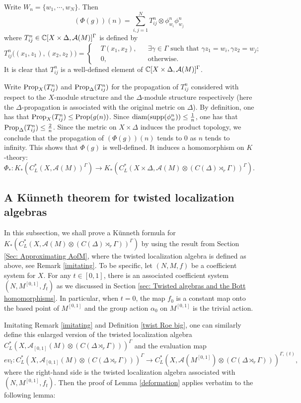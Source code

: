 \documentclass[11pt]{article}
\theoremstyle{definition}
\theoremstyle{plain}
\def\A{\mathcal A}\def\C{\mathcal C}\def\B{\mathcal B}\def\E{\mathcal E}\def\O{\mathcal O}\def\h{\mathfrak h}\def\K{\mathcal K}\def\F{\mathcal F}\def\P{\mathcal P}\def\L{\mathcal L}\def\R{\mathcal R}\def\Q{\mathcal Q}\def\H{\mathcal H}\def\S{\mathcal S}\def\N{\mathcal N}\def\U{\mathcal U}\def\V{\mathcal V}
\def\supp{\textup{supp}}
\def\prop{\textup{Prop}}
\def\diam{\textup{diam}}
\def\ox{\otimes}
\def\ox{\otimes}
\def\Ga{\Gamma}
\begin{document}
Write $W_n=\{w_1,\cdots,w_N\}$. Then
$$(\Phi(g))(n)=\sum_{i,j=1}^N T^n_{ij}\ox\phi_{w_i}^n\phi_{w_j}^n$$
where $T^n_{ij}\in\IC[X\times\Delta,\A(M)]^{\Ga}$ is defined by
$$T^n_{ij}\Big((x_1,z_1),(x_2,z_2)\Big)=\left\{\begin{aligned}&T(x_1,x_2),&&\exists\gamma\in\Ga\text{ such that }\gamma z_1=w_i,\gamma z_2=w_j;\\&0,&&\text{otherwise.}\end{aligned}\right.$$
It is clear that $T^n_{ij}$ is a well-defined element of $\IC[X\times\Delta,\A(M)]^{\Ga}$.

Write $\prop_X(T^n_{ij})$ and $\prop_\Delta(T^n_{ij})$ for the propagation of $T^n_{ij}$ considered with respect to the $X$-module structure and the $\Delta$-module structure respectively (here the $\Delta$-propagation is associated with the original metric on $\Delta$). By definition, one has that $\prop_X(T^n_{ij})\leq\prop(g(n))$. Since $\diam(\supp(\phi_w^n))\leq\frac 1n$, one has that $\prop_\Delta(T^n_{ij})\leq\frac 2n$. Since the metric on $X\times\Delta$ induces the product topology, we conclude that the propagation of $(\Phi(g))(n)$ tends to $0$ as $n$ tends to infinity. This shows that $\Phi(g)$ is well-defined. It induces a homomorphism on $K$-theory:
$$\Phi_*:K_*(C^*_L(X,\A(M))^{\Ga})\to K_*(C^*_L(X\times\Delta,\A(M)\ox(C(\Delta)\rtimes_r\Ga))^{\Ga}).$$





\subsection{A K\"unneth theorem for twisted localization algebras}
\label{subsec:Kunneth}

In this subsection, we shall prove a K\"unneth formula for $K_*(C^*_L(X,\A(M)\ox(C(\Delta)\rtimes_r\Ga))^{\Ga})$ by using the result from Section \ref{Sec: Approximating AofM}, where the twisted localization algebra is defined as above, see Remark \ref{imitating}. To be specific, let $(N,M,f)$ be a coefficient system for $X$. For any $t\in [0,1]$, there is an associated coefficient system $(N,M^{[0,1]},f_t)$ as we discussed in Section \ref{sec: Twisted algebras and the Bott homomorphisms}. In particular, when $t=0$, the map $f_0$ is a constant map onto the based point of $M^{[0,1]}$ and the group action $\alpha_0$ on $M^{[0,1]}$ is the trivial action.

Imitating Remark \ref{imitating} and Definition \ref{twist Roe big}, one can similarly define this enlarged version of the twisted localization algebra $C^*_L(X,\A_{[0,1]}(M)\ox(C(\Delta\rtimes_r\Ga)))^{\Ga}$ and the evaluation map
$$ev_t:C^*_L\left(X,\A_{[0,1]}(M)\ox(C(\Delta\rtimes_r\Ga))\right)^{\Ga}\to C^*_L\left(X,\A(M^{[0,1]})\ox(C(\Delta\rtimes_r\Ga))\right)^{\Ga,(t)},$$
where the right-hand side is the twisted localization algebra associated with $(N,M^{[0,1]},f_t)$. Then the proof of Lemma \ref{deformation} applies verbatim to the following lemma:
\end{document}
